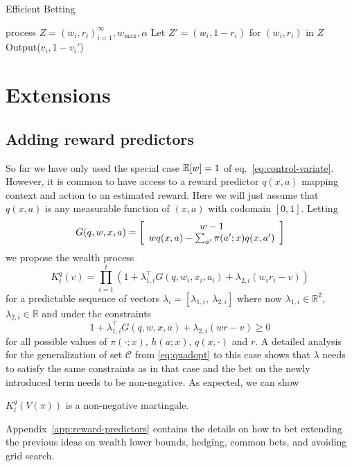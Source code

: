 \begin{algorithm}[tb]
   \caption{Efficient Betting}
   \label{alg:main}
\begin{algorithmic}
     process $Z=(w_i,r_i)_{i=1}^\infty, w_{\max}, \alpha$
    \STATE Let $Z' = (w_i,1-r_i)$ for $(w_i,r_i)$ in $Z$
        \STATE Output($v_i,1-v_i'$)
   \ENDFOR
{}
\ENDFUNCTION
\end{algorithmic}
\end{algorithm}

\section{Extensions}

\subsection{Adding reward predictors}
So far we have only used the special case $\mathbb{E}[w]=1$ 
of eq.~\eqref{eq:control-variate}. However, it is 
common to have access to a reward predictor
$q(x,a)$ mapping context and action to an 
estimated reward. Here we will just assume 
that $q(x,a)$ is any measurable 
function of $(x,a)$ with codomain $[0,1]$. Letting
\[
G(q,w,x,a)=\left[\begin{array}{c} w-1 \\ wq(x,a)-\sum_{a'}\pi(a';x)q(x,a') \end{array}\right]
\]
we propose the wealth process
\[
K_t^q(v)=\prod_{i=1}^{t}\left(1+\lambda_{1,i}^\top G(q,w_i,x_i,a_i)+\lambda_{2,i}(w_ir_i-v)\right)
\]
for a predictable sequence of vectors 
$\lambda_{i}=[\lambda_{1,i},\ \lambda_{2,i}]$ 
where now $\lambda_{1,i} \in \mathbb{R}^{2}$,
$\lambda_{2,i} \in \mathbb{R}$ and 
under the constraints 
\[
1+\lambda_{1,i}^\top G(q,w,x,a)+\lambda_{2,i}(wr-v) \geq 0 
\]
for all possible values of 
$\pi(\cdot;x)$, $h(a;x)$, $q(x,\cdot)$ and $r$.
A detailed analysis for the generalization of
set $\mathcal{C}$ from \eqref{eq:quadopt} to this case
shows that $\lambda$ needs to satisfy the same 
constraints as in that case and the bet on 
the newly introduced term needs to
be non-negative. As expected, we can show
\begin{theorem}
$K_t^q(V(\pi))$ is a non-negative martingale.
\end{theorem}
Appendix~\ref{app:reward-predictors} contains the details
on how to bet extending the previous ideas on wealth lower
bounds, hedging, common bets, and avoiding grid search.

